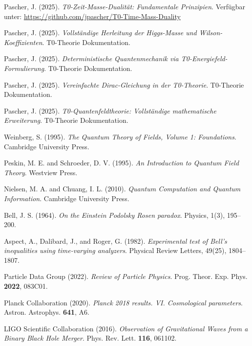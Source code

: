 \documentclass[12pt,a4paper]{article}
\begin{document}
	\begin{thebibliography}{99}
		
		Pascher, J. (2025). \textit{T0-Zeit-Masse-Dualität: Fundamentale Prinzipien}. 
		Verfügbar unter: \url{https://github.com/jpascher/T0-Time-Mass-Duality}
		
		Pascher, J. (2025). \textit{Vollständige Herleitung der Higgs-Masse und Wilson-Koeffizienten}. 
		T0-Theorie Dokumentation.
		
		Pascher, J. (2025). \textit{Deterministische Quantenmechanik via T0-Energiefeld-Formulierung}. 
		T0-Theorie Dokumentation.
		
		Pascher, J. (2025). \textit{Vereinfachte Dirac-Gleichung in der T0-Theorie}. 
		T0-Theorie Dokumentation.
		
		Pascher, J. (2025). \textit{T0-Quantenfeldtheorie: Vollständige mathematische Erweiterung}. 
		T0-Theorie Dokumentation.
		
		Weinberg, S. (1995). \textit{The Quantum Theory of Fields, Volume 1: Foundations}. 
		Cambridge University Press.
		
		Peskin, M. E. and Schroeder, D. V. (1995). \textit{An Introduction to Quantum Field Theory}. 
		Westview Press.
		
		Nielsen, M. A. and Chuang, I. L. (2010). \textit{Quantum Computation and Quantum Information}. 
		Cambridge University Press.
		
		Bell, J. S. (1964). \textit{On the Einstein Podolsky Rosen paradox}. 
		Physics, 1(3), 195--200.
		
		Aspect, A., Dalibard, J., and Roger, G. (1982). \textit{Experimental test of Bell's inequalities using time-varying analyzers}. 
		Physical Review Letters, 49(25), 1804--1807.
		
		Particle Data Group (2022). \textit{Review of Particle Physics}. 
		Prog. Theor. Exp. Phys. \textbf{2022}, 083C01.
		
		Planck Collaboration (2020). \textit{Planck 2018 results. VI. Cosmological parameters}. 
		Astron. Astrophys. \textbf{641}, A6.
		
		LIGO Scientific Collaboration (2016). \textit{Observation of Gravitational Waves from a Binary Black Hole Merger}. 
		Phys. Rev. Lett. \textbf{116}, 061102.
		
	\end{thebibliography}
	
\end{document}
